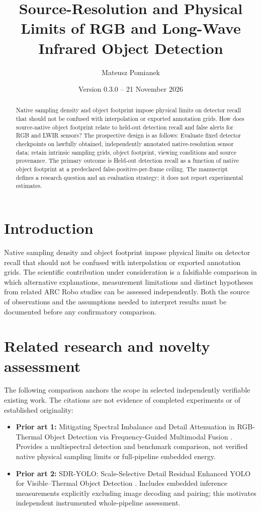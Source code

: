 \documentclass[11pt,a4paper]{article}
\title{Source-Resolution and Physical Limits of RGB and Long-Wave Infrared Object Detection}
\author{Mateusz Pomianek}
\date{Version 0.3.0 -- 21 November 2026}
\begin{document}
\maketitle

\begin{abstract}
Native sampling density and object footprint impose physical limits on detector recall that should not be confused with interpolation or exported annotation grids. How does source-native object footprint relate to held-out detection recall and false alerts for RGB and LWIR sensors? The prospective design is as follows: Evaluate fixed detector checkpoints on lawfully obtained, independently annotated native-resolution sensor data; retain intrinsic sampling grids, object footprint, viewing conditions and source provenance. The primary outcome is Held-out detection recall as a function of native object footprint at a predeclared false-positive-per-frame ceiling. The manuscript defines a research question and an evaluation strategy; it does not report experimental estimates.
\end{abstract}

\section{Introduction}
Native sampling density and object footprint impose physical limits on detector recall that should not be confused with interpolation or exported annotation grids. The scientific contribution under consideration is a falsifiable comparison in which alternative explanations, measurement limitations and distinct hypotheses from related ARC Robo studies can be assessed independently. Both the source of observations and the assumptions needed to interpret results must be documented before any confirmatory comparison.

\section{Related research and novelty assessment}
The following comparison anchors the scope in selected independently verifiable existing work. The citations are not evidence of completed experiments or of established originality:
\begin{itemize}
\item \textbf{Prior art 1:} Mitigating Spectral Imbalance and Detail Attenuation in RGB-Thermal Object Detection via Frequency-Guided Multimodal Fusion \cite{source1}. Provides a multispectral detection and benchmark comparison, not verified native physical sampling limits or full-pipeline embedded energy.
\item \textbf{Prior art 2:} SDR-YOLO: Scale-Selective Detail Residual Enhanced YOLO for Visible--Thermal Object Detection \cite{source2}. Includes embedded inference measurements explicitly excluding image decoding and pairing; this motivates independent instrumented whole-pipeline assessment.
\end{itemize}
\end{document}
